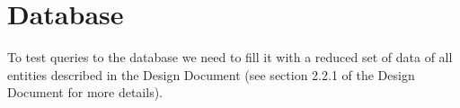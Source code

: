 \section{Database}
To test queries to the database we need to fill it with a reduced set of data of all entities described in the Design Document (see section 2.2.1 of the Design Document for more details).